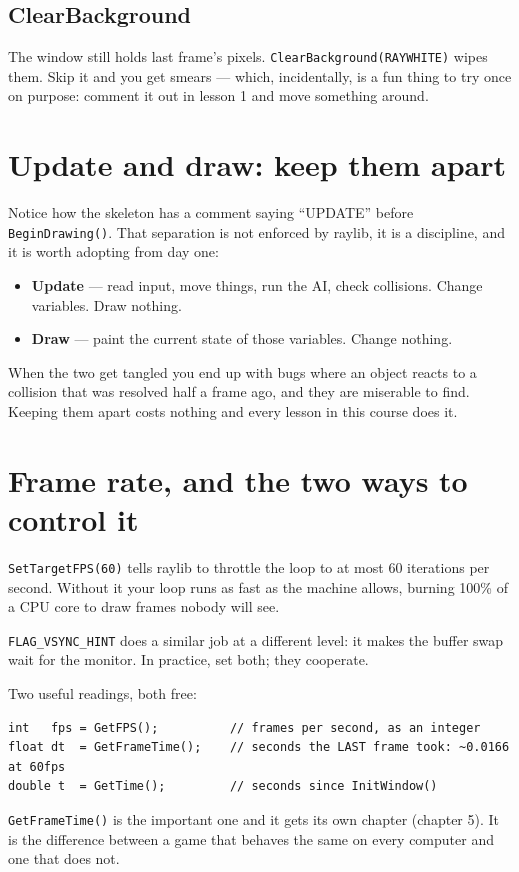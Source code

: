 \subsection{ClearBackground}

The window still holds last frame's pixels. \lstinline|ClearBackground(RAYWHITE)|
wipes them. Skip it and you get smears --- which, incidentally, is a fun thing to
try once on purpose: comment it out in lesson 1 and move something around.

\section{Update and draw: keep them apart}

Notice how the skeleton has a comment saying ``UPDATE'' before
\lstinline|BeginDrawing()|. That separation is not enforced by raylib, it is a
discipline, and it is worth adopting from day one:

\begin{itemize}[leftmargin=*,itemsep=2pt]
  \item \textbf{Update} --- read input, move things, run the AI, check
        collisions. Change variables. Draw nothing.
  \item \textbf{Draw} --- paint the current state of those variables. Change nothing.
\end{itemize}

When the two get tangled you end up with bugs where an object reacts to a
collision that was resolved half a frame ago, and they are miserable to find.
Keeping them apart costs nothing and every lesson in this course does it.

\section{Frame rate, and the two ways to control it}

\lstinline|SetTargetFPS(60)| tells raylib to throttle the loop to at most 60
iterations per second. Without it your loop runs as fast as the machine allows,
burning 100\% of a CPU core to draw frames nobody will see.

\lstinline|FLAG_VSYNC_HINT| does a similar job at a different level: it makes the
buffer swap wait for the monitor. In practice, set both; they cooperate.

Two useful readings, both free:

\begin{lstlisting}
int   fps = GetFPS();          // frames per second, as an integer
float dt  = GetFrameTime();    // seconds the LAST frame took: ~0.0166 at 60fps
double t  = GetTime();         // seconds since InitWindow()
\end{lstlisting}

\lstinline|GetFrameTime()| is the important one and it gets its own chapter
(chapter 5). It is the difference between a game that behaves the same on every
computer and one that does not.

